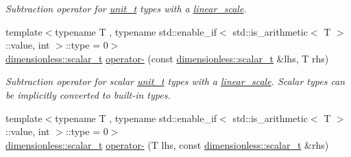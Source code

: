 \begin{DoxyCompactItemize}
\begin{DoxyCompactList}\small\item\em Subtraction operator for \hyperlink{classunits_1_1unit__t}{unit\+\_\+t} types with a \hyperlink{structunits_1_1linear__scale}{linear\+\_\+scale}. \end{DoxyCompactList}\item 
\hypertarget{namespaceunits_ab7e9eb5238fdd174f781e07982a5b1e5}{}{\footnotesize template$<$typename T , typename std\+::enable\+\_\+if$<$ std\+::is\+\_\+arithmetic$<$ T $>$\+::value, int $>$\+::type  = 0$>$ }\\\hyperlink{classunits_1_1unit__t}{dimensionless\+::scalar\+\_\+t} \hyperlink{namespaceunits_ab7e9eb5238fdd174f781e07982a5b1e5}{operator-\/} (const \hyperlink{classunits_1_1unit__t}{dimensionless\+::scalar\+\_\+t} \&lhs, T rhs)\label{namespaceunits_ab7e9eb5238fdd174f781e07982a5b1e5}

\begin{DoxyCompactList}\small\item\em Subtraction operator for scalar \hyperlink{classunits_1_1unit__t}{unit\+\_\+t} types with a \hyperlink{structunits_1_1linear__scale}{linear\+\_\+scale}. Scalar types can be implicitly converted to built-\/in types. \end{DoxyCompactList}\item 
\hypertarget{namespaceunits_a60fc90c20e60aed63820ef98427785d6}{}{\footnotesize template$<$typename T , typename std\+::enable\+\_\+if$<$ std\+::is\+\_\+arithmetic$<$ T $>$\+::value, int $>$\+::type  = 0$>$ }\\\hyperlink{classunits_1_1unit__t}{dimensionless\+::scalar\+\_\+t} \hyperlink{namespaceunits_a60fc90c20e60aed63820ef98427785d6}{operator-\/} (T lhs, const \hyperlink{classunits_1_1unit__t}{dimensionless\+::scalar\+\_\+t} \&rhs)\label{namespaceunits_a60fc90c20e60aed63820ef98427785d6}


\end{DoxyCompactItemize}
